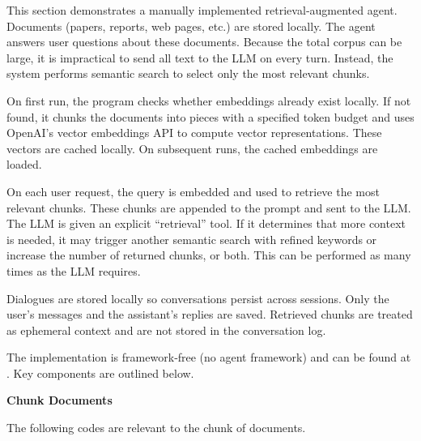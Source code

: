 This section demonstrates a manually implemented retrieval‑augmented agent. Documents (papers, reports, web pages, etc.) are stored locally. The agent answers user questions about these documents. Because the total corpus can be large, it is impractical to send all text to the LLM on every turn. Instead, the system performs semantic search to select only the most relevant chunks.

On first run, the program checks whether embeddings already exist locally. If not found, it chunks the documents into pieces with a specified token budget and uses OpenAI’s vector embeddings API to compute vector representations. These vectors are cached locally. On subsequent runs, the cached embeddings are loaded.

On each user request, the query is embedded and used to retrieve the most relevant chunks. These chunks are appended to the prompt and sent to the LLM. The LLM is given an explicit ``retrieval'' tool. If it determines that more context is needed, it may trigger another semantic search with refined keywords or increase the number of returned chunks, or both. This can be performed as many times as the LLM requires.

Dialogues are stored locally so conversations persist across sessions. Only the user’s messages and the assistant’s replies are saved. Retrieved chunks are treated as ephemeral context and are not stored in the conversation log.

The implementation is framework‑free (no agent framework) and can be found at \cite{sun2025document}. Key components are outlined below.

\vspace{0.1in}
\noindent \textbf{Chunk Documents}
\vspace{0.1in}

The following codes are relevant to the chunk of documents.

